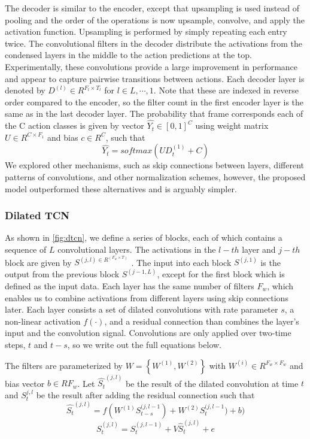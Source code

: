 The decoder is similar to the encoder, except that upsampling is used instead of pooling and the order of the operations is now upsample, convolve, and apply the activation function. Upsampling is performed by simply repeating each entry twice. The convolutional filters in the decoder distribute the activations from the condensed layers in the middle to the action predictions at the top. Experimentally, these convolutions provide a large improvement in performance and appear to capture pairwise transitions between actions. Each decoder layer is denoted by $D^{(l)} \in R^{F_l \times T_l}$ for $l \in L,\cdots,1$. Note that these are indexed in reverse order compared to the encoder, so the filter count in the first encoder layer is the same as in the last decoder layer. The probability that frame  corresponds each of the C action classes is given by vector $\hat{Y_t} \in \left[0,1\right]^C$ using weight matrix $U \in R^{C \times F_1}$ and bias $c \in R^C$, such that $$\hat{Y_t} = softmax(UD_t^{(1)}+C)$$
We explored other mechanisms, such as skip connections between layers, different patterns of convolutions, and other normalization schemes, however, the proposed model outperformed these alternatives and is arguably simpler.

\subsubsection{Dilated TCN}
As shown in \ref{fig:dtcn}, we define a series of blocks, each of which contains a sequence of $L$ convolutional layers. The activations in the $l-th$ layer and $j-th$ block are given by $S^{(j,l) \in R^{(F_w \times T)}}$ . The input into each block $S^{(j,1)}$ is the output from the previous block $S^{(j-1,L)}$, except for the first block which is defined as the input data. Each layer has the same number of filters $F_w$, which enables us to combine activations from different layers using skip connections later. Each layer consists a set of dilated convolutions with rate parameter $s$, a non-linear activation $f(\cdot)$, and a residual connection than combines the layer’s input and the convolution signal. Convolutions are only applied over two-time steps, $t$ and $t-s$, so we write out the full equations below. 

The filters are parameterized by $W = \left\{W^{(1)},W^{(2)}\right\}$ with $W^{(i)} \in R^{F_w \times F_w}$ and bias vector $b \in R{F_w}$. Let $\hat{S_t}^{(j,l)}$ be the result of the dilated convolution at time $t$ and $S_t^{j,l}$ be the result after adding the residual connection such that $$\hat{S_t}^{(j,l)} = f(W^{(1)}S_{t-s}^{(j,l-1})+W^{(2)}S_{t}^{(j,l-1})+b)$$
$$ S_t^{\left(j,l\right)}=S_t^{\left(j,l-1\right)}+V{\hat{S}}_t^{\left(j,l\right)}+e $$

